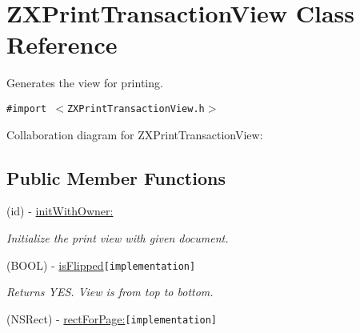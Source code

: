 \hypertarget{interface_z_x_print_transaction_view}{
\section{ZXPrintTransactionView Class Reference}
\label{interface_z_x_print_transaction_view}
}
Generates the view for printing.  


{\tt \#import $<$ZXPrintTransactionView.h$>$}

Collaboration diagram for ZXPrintTransactionView:\subsection*{Public Member Functions}
\begin{CompactItemize}
\item 
(id) - \hyperlink{interface_z_x_print_transaction_view_78bbca384b07eeb77a7aaba3b81e473b}{initWithOwner:}
\begin{CompactList}\small\item\em Initialize the print view with given document. \item\end{CompactList}\item 
\hypertarget{interface_z_x_print_transaction_view_a907517604f0c9dc5c69fe193b37638c}{
(BOOL) - \hyperlink{interface_z_x_print_transaction_view_a907517604f0c9dc5c69fe193b37638c}{isFlipped}{\tt  \mbox{[}implementation\mbox{]}}}
\label{interface_z_x_print_transaction_view_a907517604f0c9dc5c69fe193b37638c}

\begin{CompactList}\small\item\em Returns YES. View is from top to bottom. \item\end{CompactList}\item 
\hypertarget{interface_z_x_print_transaction_view_b00f9ba359ff0c6c37e0b0e595d1bea6}{
(NSRect) - \hyperlink{interface_z_x_print_transaction_view_b00f9ba359ff0c6c37e0b0e595d1bea6}{rectForPage:}{\tt  \mbox{[}implementation\mbox{]}}}
\label{interface_z_x_print_transaction_view_b00f9ba359ff0c6c37e0b0e595d1bea6}


\end{CompactItemize}
